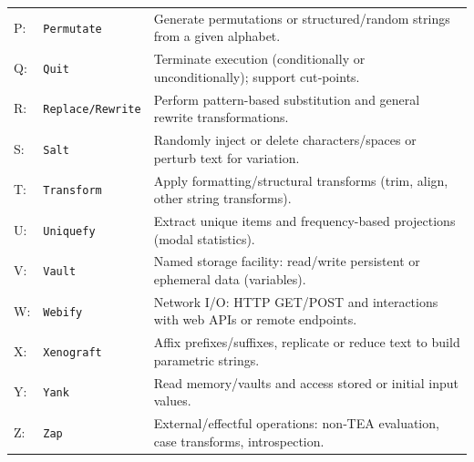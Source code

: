 \documentclass[acmtoplas]{acmart}
\begin{document}
\begin{table}[ht]
\begin{tabular}{@{}p{} p{} p{}@{}}
    P: & \texttt{Permutate} & Generate permutations or structured/random strings from a given alphabet. \\
    Q: & \texttt{Quit} & Terminate execution (conditionally or unconditionally); support cut‑points. \\
    R: & \texttt{Replace/Rewrite} & Perform pattern-based substitution and general rewrite transformations. \\
    S: & \texttt{Salt} & Randomly inject or delete characters/spaces or perturb text for variation. \\
    T: & \texttt{Transform} & Apply formatting/structural transforms (trim, align, other string transforms). \\
    U: & \texttt{Uniquefy} & Extract unique items and frequency-based projections (modal statistics). \\
    V: & \texttt{Vault} & Named storage facility: read/write persistent or ephemeral data (variables). \\
    W: & \texttt{Webify} & Network I/O: HTTP GET/POST and interactions with web APIs or remote endpoints. \\
    X: & \texttt{Xenograft} & Affix prefixes/suffixes, replicate or reduce text to build parametric strings. \\
    Y: & \texttt{Yank} & Read memory/vaults and access stored or initial input values. \\
    Z: & \texttt{Zap} & External/effectful operations: non‑TEA evaluation, case transforms, introspection. \\
    \bottomrule
  \end{tabular}
\end{table}
\end{document}
